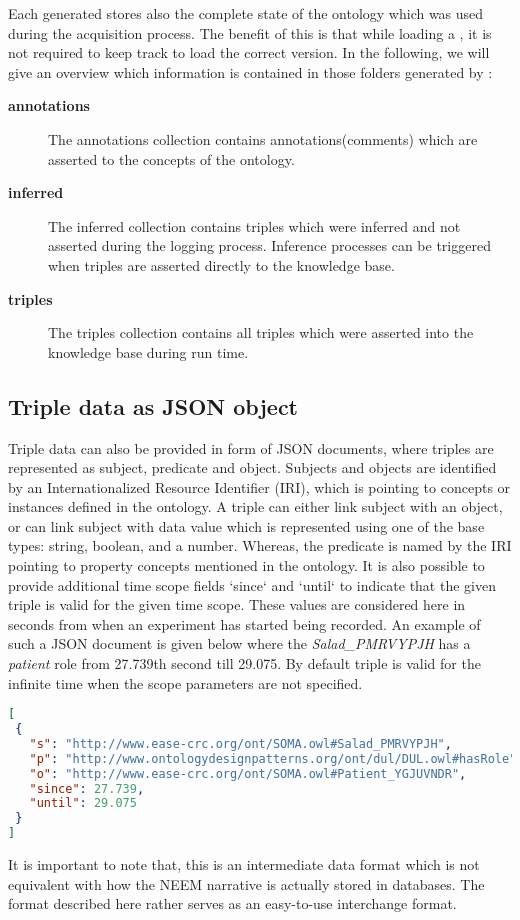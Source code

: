 Each generated \neem stores also the complete state of the \soma ontology which was used during the acquisition process.
The benefit of this is that while loading a \neem, it is not required to keep track to load the correct \soma version.
In the following, we will give an overview which information is contained in those folders generated by \knowrob:


\begin{description}
	\item[\textbf{annotations}] The annotations collection contains annotations(comments) which are asserted to the concepts of the ontology.
	\item[\textbf{inferred}] The inferred collection contains triples which were inferred and not asserted during the logging process. Inference processes can be triggered when triples are asserted directly to the knowledge base.
	\item[\textbf{triples}] The triples collection contains all triples which were asserted into the knowledge base during run time.
\end{description}

\subsection{Triple data as JSON object}
	Triple data can also be provided in form of JSON documents, where triples are represented as subject, predicate and object. Subjects and objects are identified by an Internationalized Resource Identifier (IRI), which is pointing to concepts or instances defined in the \soma ontology. A triple can either link subject with an object, or can link subject with data value which is represented using one of the base types: string, boolean, and a number. Whereas, the predicate is named by the IRI pointing to property concepts mentioned in the \soma ontology. It is also possible to provide additional time scope fields `since` and `until` to indicate that the given triple is valid for the given time scope. These values are considered here in seconds from when an experiment has started being recorded. An example of such a JSON document is given below where the \emph{Salad\_PMRVYPJH} has a \emph{patient} role from 27.739th second till 29.075. By default triple is valid for the infinite time when the scope parameters are not specified. 
\begin{lstlisting}[language=json,firstnumber=1]
[
 {
   "s": "http://www.ease-crc.org/ont/SOMA.owl#Salad_PMRVYPJH",
   "p": "http://www.ontologydesignpatterns.org/ont/dul/DUL.owl#hasRole",
   "o": "http://www.ease-crc.org/ont/SOMA.owl#Patient_YGJUVNDR",
   "since": 27.739,
   "until": 29.075
 }
]
\end{lstlisting}

It is important to note that, this is an intermediate data format which is not equivalent with how the NEEM narrative is actually stored in databases.
The format described here rather serves as an easy-to-use interchange format.



